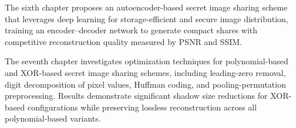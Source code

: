 \begin{center}
\begin{center}
The sixth chapter proposes an autoencoder-based secret image sharing scheme that leverages deep learning for storage-efficient and secure image distribution, training an encoder--decoder network to generate compact shares with competitive reconstruction quality measured by PSNR and SSIM.

The seventh chapter investigates optimization techniques for polynomial-based and XOR-based secret image sharing schemes, including leading-zero removal, digit decomposition of pixel values, Huffman coding, and pooling-permutation preprocessing. Results demonstrate significant shadow size reductions for XOR-based configurations while preserving lossless reconstruction across all polynomial-based variants.

\end{center}
\end{center}

\\
\clearpage
